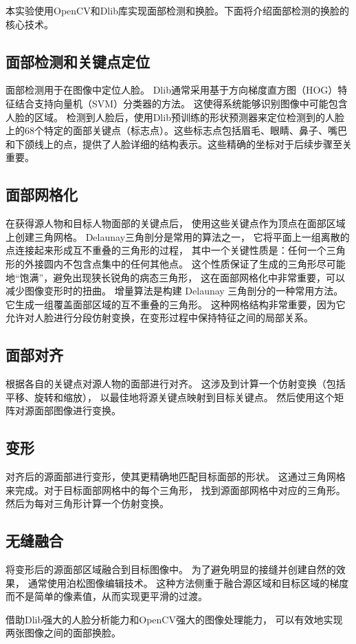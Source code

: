 
本实验使用OpenCV和Dlib库实现面部检测和换脸。下面将介绍面部检测的换脸的核心技术。

\subsection{面部检测和关键点定位}
面部检测用于在图像中定位人脸。
Dlib通常采用基于方向梯度直方图（HOG）特征结合支持向量机（SVM）分类器的方法。
这使得系统能够识别图像中可能包含人脸的区域。
检测到人脸后，使用Dlib预训练的形状预测器来定位检测到的人脸上的68个特定的面部关键点（标志点）。这些标志点包括眉毛、眼睛、鼻子、嘴巴和下颌线上的点，提供了人脸详细的结构表示。这些精确的坐标对于后续步骤至关重要。

\subsection{面部网格化}
在获得源人物和目标人物面部的关键点后，
使用这些关键点作为顶点在面部区域上创建三角网格。
Delaunay三角剖分是常用的算法之一，
它将平面上一组离散的点连接起来形成互不重叠的三角形的过程，
其中一个关键性质是：任何一个三角形的外接圆内不包含点集中的任何其他点。
这个性质保证了生成的三角形尽可能地“饱满”，避免出现狭长锐角的病态三角形，
这在面部网格化中非常重要，可以减少图像变形时的扭曲。
增量算法是构建 Delaunay 三角剖分的一种常用方法。
它生成一组覆盖面部区域的互不重叠的三角形。
这种网格结构非常重要，因为它允许对人脸进行分段仿射变换，在变形过程中保持特征之间的局部关系。

\subsection{面部对齐}
根据各自的关键点对源人物的面部进行对齐。
这涉及到计算一个仿射变换（包括平移、旋转和缩放），
以最佳地将源关键点映射到目标关键点。
然后使用这个矩阵对源面部图像进行变换。

\subsection{变形}
对齐后的源面部进行变形，使其更精确地匹配目标面部的形状。
这通过三角网格来完成。对于目标面部网格中的每个三角形，
找到源面部网格中对应的三角形。
然后为每对三角形计算一个仿射变换。

\subsection{无缝融合}
将变形后的源面部区域融合到目标图像中。
为了避免明显的接缝并创建自然的效果，
通常使用泊松图像编辑技术。
这种方法侧重于融合源区域和目标区域的梯度而不是简单的像素值，从而实现更平滑的过渡。

借助Dlib强大的人脸分析能力和OpenCV强大的图像处理能力，
可以有效地实现两张图像之间的面部换脸。
